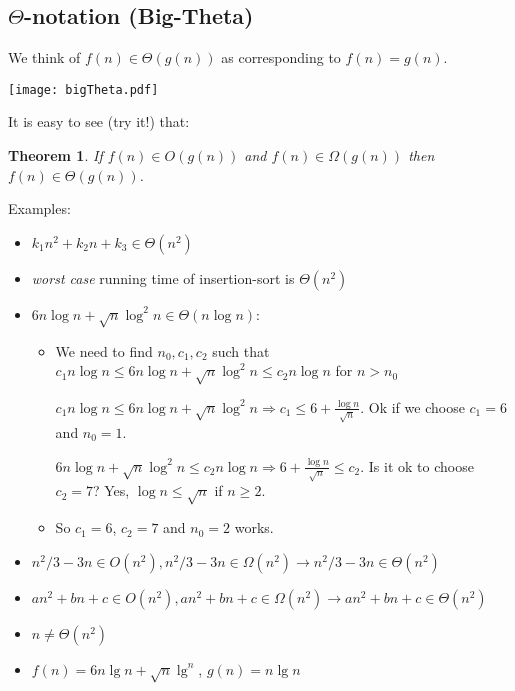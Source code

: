 \documentclass[11pt]{article}
\newtheorem{theorem}{Theorem}
\begin{document}
\subsection{$\Theta$-notation (Big-Theta)}


We think of $f(n)\in \Theta(g(n))$ as corresponding to $f(n)=g(n)$.

\texttt{[image: bigTheta.pdf]}

\vspace{.5cm}


It is easy to see (try it!) that:
\begin{theorem}
If $f(n) \in O(g(n))$ and $f(n) \in \Omega(g(n))$ then $f(n) \in
\Theta (g(n))$.
\end{theorem}


Examples:
  \begin{itemize}
  \item $k_1n^2+k_2n+k_3 \in \Theta(n^2)$
  \item {\em worst case} running time of insertion-sort is $\Theta(n^2)$
  \item $6n\log n+\sqrt{n}\log^2 n \in \Theta(n\log n)$:
    \begin{itemize}
    \item We need to find $n_0, c_1, c_2$ such that $c_1n\log n\leq
    6n\log n+\sqrt{n}\log^2 n\leq c_2n\log n$ for $n>n_0$

    $c_1n\log n\leq 6n\log n+\sqrt{n}\log^2 n \Rightarrow c_1\leq
    6+\frac{\log n}{\sqrt{n}}$. Ok if we choose $c_1=6$ and $n_0=1$.

    $6n\log n+\sqrt{n}\log^2 n\leq c_2n\log n \Rightarrow
    6+\frac{\log n}{\sqrt{n}}\leq c_2$. Is it ok to choose $c_2=7$? Yes, $\log
    n\leq \sqrt{n}$ if $n\geq 2$.
    \item So $c_1=6$, $c_2=7$ and $n_0=2$ works.
    \end{itemize}
\item $n^2/3 -3n \in O(n^2), n^2/3 -3n \in \Omega(n^2) \longrightarrow
n^2/3 -3n \in \Theta(n^2)$

\item $a n^2 +bn +c \in O(n^2), a n^2 +bn +c \in \Omega(n^2)
\longrightarrow a n^2 +bn +c \in \Theta(n^2)$

\item $n \neq \Theta(n^2)$

\item $f(n) = 6n \lg n + \sqrt n \lg^n$, $g(n) = n \lg n$
\end{itemize}
\end{document}
